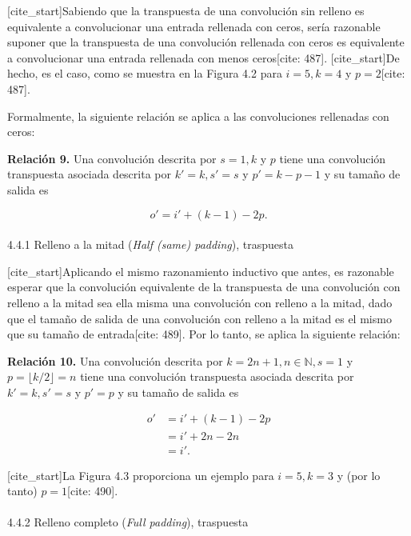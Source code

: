 \documentclass[
  super,
  preprint,
  3p]{elsarticle}
\makeatletter
\let\oldparagraph\paragraph
\renewcommand{\paragraph}{
    \@ifstar
      \xxxParagraphStar
      \xxxParagraphNoStar
  }
\newcommand{\xxxParagraphStar}[1]{\oldparagraph*{#1}\mbox{}}
\newcommand{\xxxParagraphNoStar}[1]{\oldparagraph{#1}\mbox{}}
\makeatother
\begin{document}
{[}cite\_start{]}Sabiendo que la transpuesta de una convolución sin
relleno es equivalente a convolucionar una entrada rellenada con ceros,
sería razonable suponer que la transpuesta de una convolución rellenada
con ceros es equivalente a convolucionar una entrada rellenada con menos
ceros{[}cite: 487{]}. {[}cite\_start{]}De hecho, es el caso, como se
muestra en la Figura 4.2 para \(i = 5, k = 4\) y \(p = 2\){[}cite:
487{]}.

Formalmente, la siguiente relación se aplica a las convoluciones
rellenadas con ceros:

\textbf{Relación 9.} Una convolución descrita por \(s = 1, k\) y \(p\)
tiene una convolución transpuesta asociada descrita por
\(k' = k, s' = s\) y \(p' = k - p - 1\) y su tamaño de salida es

\[o' = i' + (k - 1) - 2p.\]

\paragraph{\texorpdfstring{4.4.1 Relleno a la mitad (\emph{Half (same)
padding}),
traspuesta}{4.4.1 Relleno a la mitad (Half (same) padding), traspuesta}}\label{relleno-a-la-mitad-half-same-padding-traspuesta}

{[}cite\_start{]}Aplicando el mismo razonamiento inductivo que antes, es
razonable esperar que la convolución equivalente de la transpuesta de
una convolución con relleno a la mitad sea ella misma una convolución
con relleno a la mitad, dado que el tamaño de salida de una convolución
con relleno a la mitad es el mismo que su tamaño de entrada{[}cite:
489{]}. Por lo tanto, se aplica la siguiente relación:

\textbf{Relación 10.} Una convolución descrita por
\(k = 2n + 1, n \in \mathbb{N}, s = 1\) y
\(p = \lfloor k/2 \rfloor = n\) tiene una convolución transpuesta
asociada descrita por \(k' = k, s' = s\) y \(p' = p\) y su tamaño de
salida es

\[
\begin{aligned}
o' &= i' + (k - 1) - 2p \\
&= i' + 2n - 2n \\
&= i'.
\end{aligned}
\]

{[}cite\_start{]}La Figura 4.3 proporciona un ejemplo para
\(i = 5, k = 3\) y (por lo tanto) \(p = 1\){[}cite: 490{]}.

\paragraph{\texorpdfstring{4.4.2 Relleno completo (\emph{Full padding}),
traspuesta}{4.4.2 Relleno completo (Full padding), traspuesta}}\label{relleno-completo-full-padding-traspuesta}
\end{document}
